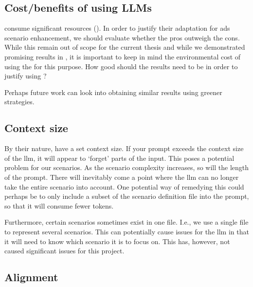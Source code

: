 \subsection{Cost/benefits of using LLMs}

 consume significant resources (). In order to justify their
adaptation for \acrshort{ads} scenario enhancement, we should evaluate whether the pros outweigh the
cons. While this remain out of scope for the current thesis and while we demonstrated promising
results in , it is important to keep in mind the environmental cost of using the
 for this purpose. How good should the results need to be in order to justify using
?

Perhaps future work can look into obtaining similar results using greener strategies.


\subsection{Context size}

By their nature,  have a set context size. If your prompt exceeds the context size
of the \acrshort{llm}, it will appear to `forget' parts of the input. This poses a potential problem
for our scenarios. As the scenario complexity increases, so will the length of the prompt. There
will inevitably come a point where the \acrshort{llm} can no longer take the entire scenario into
account. One potential way of remedying this could perhaps be to only include a subset of the
scenario definition file into the prompt, so that it will consume fewer tokens.

Furthermore, certain scenarios sometimes exist in one file. I.e., we use a single file to represent
several scenarios. This can potentially cause issues for the \acrshort{llm} in that it will need to
know which scenario it is to focus on. This has, however, not caused significant issues for this project.

\subsection{Alignment}

